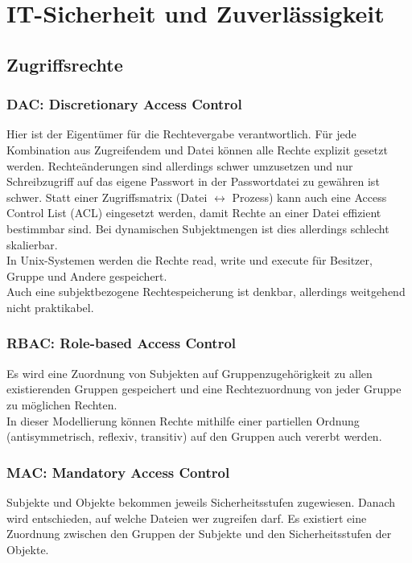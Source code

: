 \chapter{IT-Sicherheit und Zuverlässigkeit}

\section{Zugriffsrechte}

\subsection{DAC: Discretionary Access Control}
Hier ist der Eigentümer für die Rechtevergabe verantwortlich. Für jede Kombination aus Zugreifendem und Datei können alle Rechte explizit gesetzt werden. Rechteänderungen sind allerdings schwer umzusetzen und nur Schreibzugriff auf das eigene Passwort in der Passwortdatei zu gewähren ist schwer. Statt einer Zugriffsmatrix (Datei $\leftrightarrow$ Prozess) kann auch eine Access Control List (ACL) eingesetzt werden, damit Rechte an einer Datei effizient bestimmbar sind. Bei dynamischen Subjektmengen ist dies allerdings schlecht skalierbar.\\In Unix-Systemen werden die Rechte read, write und execute für Besitzer, Gruppe und Andere gespeichert.\\Auch eine subjektbezogene Rechtespeicherung ist denkbar, allerdings weitgehend nicht praktikabel.

\subsection{RBAC: Role-based Access Control}
Es wird eine Zuordnung von Subjekten auf Gruppenzugehörigkeit zu allen existierenden Gruppen gespeichert und eine Rechtezuordnung von jeder Gruppe zu möglichen Rechten.\\In dieser Modellierung können Rechte mithilfe einer partiellen Ordnung (antisymmetrisch, reflexiv, transitiv) auf den Gruppen auch vererbt werden.

\subsection{MAC: Mandatory Access Control}
Subjekte und Objekte bekommen jeweils Sicherheitsstufen zugewiesen. Danach wird entschieden, auf welche Dateien wer zugreifen darf. Es existiert eine Zuordnung zwischen den Gruppen der Subjekte und den Sicherheitsstufen der Objekte.

